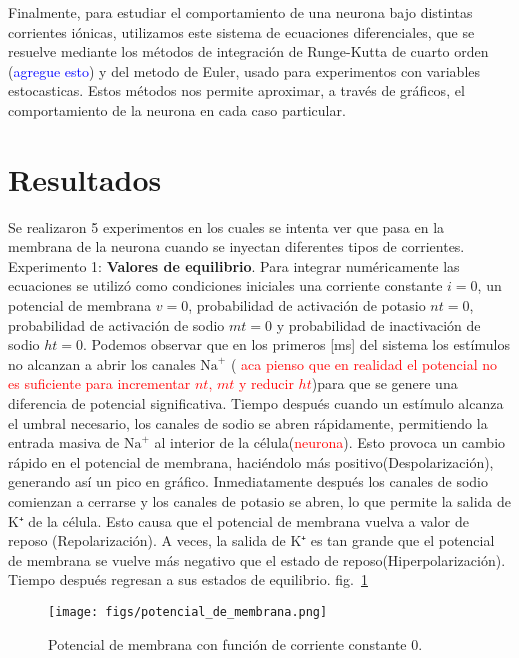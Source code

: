 \documentclass[aps,prl,twocolumn,groupedaddress]{revtex4-2}
\begin{document}
Finalmente, para estudiar el comportamiento de una neurona bajo distintas corrientes iónicas, utilizamos este sistema de ecuaciones diferenciales, que se resuelve mediante los métodos de integración de Runge-Kutta de cuarto orden (\textcolor{blue}{agregue esto})
y del metodo de Euler, usado para experimentos con variables estocasticas.  Estos métodos nos permite aproximar, a través de gráficos, el comportamiento de la neurona en cada caso particular.



\section{Resultados}
Se realizaron 5 experimentos en los cuales se intenta ver que pasa en la membrana de la neurona cuando se inyectan diferentes tipos de corrientes.\\



Experimento 1: \textbf{Valores de equilibrio}. Para integrar numéricamente las ecuaciones se utilizó como condiciones iniciales una corriente constante $i=0$, un potencial de membrana $v=0$, probabilidad de activación de potasio $nt=0$, probabilidad de activación de sodio $mt=0$ y probabilidad de inactivación de sodio $ht =0$. Podemos observar que en los primeros [ms] del sistema los estímulos no alcanzan a abrir los canales $\mathrm{Na}^+$ (\textcolor{red}{ aca pienso que en realidad el potencial no es suficiente para incrementar $nt$, $mt$ y  reducir $ht$})para que se genere una diferencia de potencial significativa. Tiempo después cuando un estímulo alcanza el umbral necesario, los canales de sodio se abren rápidamente, permitiendo la entrada masiva de $\mathrm{Na}^+$ al interior de la célula(\textcolor{red}{neurona}). Esto provoca un cambio rápido en el potencial de membrana, haciéndolo más positivo(Despolarización), generando así un pico en gráfico. Inmediatamente después los canales de sodio comienzan a cerrarse y los canales de potasio se abren, lo que permite la salida de K⁺ de la célula. Esto causa que el potencial de membrana vuelva a valor de reposo (Repolarización).  A veces, la salida de K⁺ es tan grande que el potencial de membrana se vuelve más negativo que el estado de reposo(Hiperpolarización). Tiempo después regresan a sus estados de equilibrio. fig.~\ref{fig1}\\

\begin{figure}[h!]
\centering
\texttt{[image: figs/potencial\_de\_membrana.png]}
\caption{Potencial de membrana con función de corriente constante 0. \label{fig1}}
\end{figure}
\end{document}
